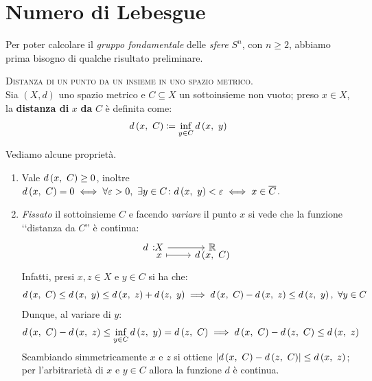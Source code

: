 \section{Numero di Lebesgue}
Per poter calcolare il \textit{gruppo fondamentale} delle \textit{sfere} $S^n$, con $n\geq 2$, abbiamo prima bisogno di qualche risultato preliminare.
\begin{define} \textsc{Distanza di un punto da un insieme in uno spazio metrico.}\\
Sia $\left(X, d\right)$ uno spazio metrico e $C\subseteq X$ un sottoinsieme non vuoto; preso $x\in X$, la \textbf{distanza di} $x$ \textbf{da} $C$ è definita come:
\begin{equation}
	d\left(x,\ C\right)\coloneqq \inf_{y\in C} d\left(x,\ y\right)
\end{equation}
\vspace{-6mm}
\end{define}
Vediamo alcune proprietà.
\begin{enumerate}
	\item Vale $d\left(x,\ C\right)\geq 0$, inoltre $d\left(x,\ C\right)=0 \iff \forall\varepsilon >0,\ \exists y\in C \colon d\left(x,\ y\right)<\varepsilon \iff x\in\overline{C}$.
	\item \textit{Fissato} il sottoinsieme $C$ e facendo \textit{variare} il punto $x$ si vede che la funzione ‘‘distanza da $C$'' è continua:
	\begin{equation*}
		\funztot d X \realset x {\mvf{d}{x}{C}}
	\end{equation*}
	Infatti, presi $x,z\in X$ e $y\in C$ si ha che:
	\begin{equation*}
		d\left(x,\ C\right)\leq d\left(x,\ y\right) \leq d\left(x,\ z\right) + d\left(z,\ y\right) \implies d\left(x,\ C\right) - d\left(x,\ z\right) \leq d\left(z,\ y\right),\ \forall y\in C
		\end{equation*}
	Dunque, al variare di $y$:
		\begin{equation*}
		d\left(x,\ C\right) - d\left(x,\ z\right) \leq \inf_{y\in C} d\left(z,\ y\right) = d\left(z,\ C\right) \implies d\left(x,\ C\right) - d\left(z,\ C\right) \leq d\left(x,\ z\right)
	\end{equation*}
	Scambiando simmetricamente $x$ e $z$ si ottiene  $\lvert d\left(x,\ C\right) - d\left(z,\ C\right) \rvert \leq d\left(x,\ z\right)$; per l'arbitrarietà di $x$ e $y\in C$ allora la funzione $d$ è continua.
\end{enumerate}

